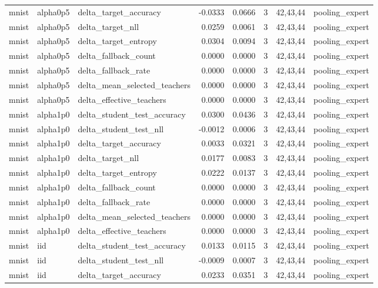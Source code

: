 \begin{tabular}{lllrrrll}
mnist & alpha0p5 & delta\_target\_accuracy & -0.0333 & 0.0666 & 3 & 42,43,44 & pooling\_expert \\
mnist & alpha0p5 & delta\_target\_nll & 0.0259 & 0.0061 & 3 & 42,43,44 & pooling\_expert \\
mnist & alpha0p5 & delta\_target\_entropy & 0.0304 & 0.0094 & 3 & 42,43,44 & pooling\_expert \\
mnist & alpha0p5 & delta\_fallback\_count & 0.0000 & 0.0000 & 3 & 42,43,44 & pooling\_expert \\
mnist & alpha0p5 & delta\_fallback\_rate & 0.0000 & 0.0000 & 3 & 42,43,44 & pooling\_expert \\
mnist & alpha0p5 & delta\_mean\_selected\_teachers & 0.0000 & 0.0000 & 3 & 42,43,44 & pooling\_expert \\
mnist & alpha0p5 & delta\_effective\_teachers & 0.0000 & 0.0000 & 3 & 42,43,44 & pooling\_expert \\
mnist & alpha1p0 & delta\_student\_test\_accuracy & 0.0300 & 0.0436 & 3 & 42,43,44 & pooling\_expert \\
mnist & alpha1p0 & delta\_student\_test\_nll & -0.0012 & 0.0006 & 3 & 42,43,44 & pooling\_expert \\
mnist & alpha1p0 & delta\_target\_accuracy & 0.0033 & 0.0321 & 3 & 42,43,44 & pooling\_expert \\
mnist & alpha1p0 & delta\_target\_nll & 0.0177 & 0.0083 & 3 & 42,43,44 & pooling\_expert \\
mnist & alpha1p0 & delta\_target\_entropy & 0.0222 & 0.0137 & 3 & 42,43,44 & pooling\_expert \\
mnist & alpha1p0 & delta\_fallback\_count & 0.0000 & 0.0000 & 3 & 42,43,44 & pooling\_expert \\
mnist & alpha1p0 & delta\_fallback\_rate & 0.0000 & 0.0000 & 3 & 42,43,44 & pooling\_expert \\
mnist & alpha1p0 & delta\_mean\_selected\_teachers & 0.0000 & 0.0000 & 3 & 42,43,44 & pooling\_expert \\
mnist & alpha1p0 & delta\_effective\_teachers & 0.0000 & 0.0000 & 3 & 42,43,44 & pooling\_expert \\
mnist & iid & delta\_student\_test\_accuracy & 0.0133 & 0.0115 & 3 & 42,43,44 & pooling\_expert \\
mnist & iid & delta\_student\_test\_nll & -0.0009 & 0.0007 & 3 & 42,43,44 & pooling\_expert \\
mnist & iid & delta\_target\_accuracy & 0.0233 & 0.0351 & 3 & 42,43,44 & pooling\_expert \\

\end{tabular}
